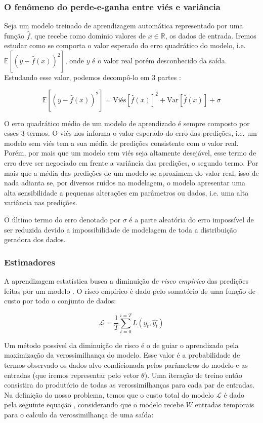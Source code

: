 \subsubsection{O fenômeno do perde-e-ganha entre viés e variância}

Seja um modelo treinado de aprendizagem automática representado por uma função
$\hat{f}$, que recebe como domínio valores de $x \in \mathbb{R}$, os dados de
entrada. Iremos estudar como se comporta o valor esperado do erro quadrático do
modelo, i.e. $\mathbb{E}[(y - \hat{f}(x))^2]$, onde $y$ é o valor real porém
desconhecido da saída. Estudando esse valor, podemos decompô-lo em
3 partes \citep{mlprob}:

\[
  \mathbb{E}[(y - \hat{f}(x))^2] = \text{Viés}[\hat{f}(x)]^2 +
  \text{Var}[\hat{f}(x)] + \sigma 
\]

O erro quadrático médio de um modelo de aprendizado
é sempre composto por esses 3 termos. O viés nos informa o valor esperado do
erro das predições, i.e. um modelo sem viés tem a sua média de predições
consistente com o valor real. Porém, por mais que um modelo sem viés seja
altamente desejável, esse termo de erro deve ser negociado em frente a variância
das predições, o segundo termo. Por mais que a média das predições de um modelo
se aproximem do valor real, isso de nada adianta se, por diversos ruídos na
modelagem, o modelo apresentar uma alta sensibilidade a pequenas alterações em
parâmetros ou dados, i.e. uma alta variância nas predições.

O último termo do erro denotado por $\sigma$ é a parte aleatória do erro
impossível de ser reduzida devido a impossibilidade de modelagem de toda a
distribuição geradora dos dados.

\subsubsection{Estimadores}
\label{sec:est}

A aprendizagem estatística busca a diminuição de \textit{risco empírico} das predições feitas por
um modelo \citep{mlprob}. O risco empírico é dado pelo somatório de uma função
de custo por todo o conjunto de dados:

\[
  \mathcal{L} = \frac{1}{T}\sum_{t=0}^{i=T}L(y_t,\hat{y_t}) 
\]

Um método possível da diminuição de risco é o de guiar o aprendizado pela
maximização da verossimilhança do modelo. Esse valor é a probabilidade de termos
observado os dados alvo condicionada pelos parâmetros do modelo e as entradas
(que iremos representar pelo vetor $\theta$). Uma iteração de
treino então consistira do produtório de todas as verossimilhanças para cada par
de entradas. Na definição do nosso problema, temos que o custo total do modelo
$\mathcal{L}$ é dado pela seguinte equação \citep{dlbook}, considerando que o
modelo recebe $W$ entradas temporais para o calculo da verossimilhança de uma saída:

